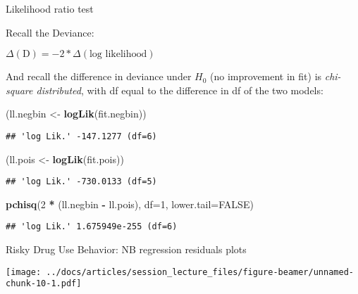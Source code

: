 \documentclass[
  ignorenonframetext,
]{beamer}
\newenvironment{Shaded}{\begin{snugshade}}{\end{snugshade}}
\newcommand{\DataTypeTok}[1]{\textcolor[rgb]{0.13,0.29,0.53}{#1}}
\newcommand{\DecValTok}[1]{\textcolor[rgb]{0.00,0.00,0.81}{#1}}
\newcommand{\KeywordTok}[1]{\textcolor[rgb]{0.13,0.29,0.53}{\textbf{#1}}}
\newcommand{\NormalTok}[1]{#1}
\newcommand{\OperatorTok}[1]{\textcolor[rgb]{0.81,0.36,0.00}{\textbf{#1}}}
\newcommand{\OtherTok}[1]{\textcolor[rgb]{0.56,0.35,0.01}{#1}}
\newcommand{\StringTok}[1]{\textcolor[rgb]{0.31,0.60,0.02}{#1}}
\begin{document}
\begin{frame}[fragile]{Likelihood ratio test}
\protect\hypertarget{likelihood-ratio-test}{}

Recall the Deviance:

\(\Delta (\textrm{D}) = -2 * \Delta (\textrm{log likelihood})\)

And recall the difference in deviance under \(H_0\) (no improvement in
fit) is \emph{chi-square distributed}, with df equal to the difference
in df of the two models:

\begin{Shaded}
\begin{Highlighting}[]
\NormalTok{(ll.negbin <-}\StringTok{ }\KeywordTok{logLik}\NormalTok{(fit.negbin))}
\end{Highlighting}
\end{Shaded}

\begin{verbatim}
## 'log Lik.' -147.1277 (df=6)
\end{verbatim}

\begin{Shaded}
\begin{Highlighting}[]
\NormalTok{(ll.pois <-}\StringTok{ }\KeywordTok{logLik}\NormalTok{(fit.pois))}
\end{Highlighting}
\end{Shaded}

\begin{verbatim}
## 'log Lik.' -730.0133 (df=5)
\end{verbatim}

\begin{Shaded}
\begin{Highlighting}[]
\KeywordTok{pchisq}\NormalTok{(}\DecValTok{2} \OperatorTok{*}\StringTok{ }\NormalTok{(ll.negbin }\OperatorTok{-}\StringTok{ }\NormalTok{ll.pois), }\DataTypeTok{df=}\DecValTok{1}\NormalTok{, }\DataTypeTok{lower.tail=}\OtherTok{FALSE}\NormalTok{)}
\end{Highlighting}
\end{Shaded}

\begin{verbatim}
## 'log Lik.' 1.675949e-255 (df=6)
\end{verbatim}

\end{frame}

\begin{frame}{Risky Drug Use Behavior: NB regression residuals plots}
\protect\hypertarget{risky-drug-use-behavior-nb-regression-residuals-plots}{}

\texttt{[image: ../docs/articles/session\_lecture\_files/figure-beamer/unnamed-chunk-10-1.pdf]}

\end{frame}
\end{document}
